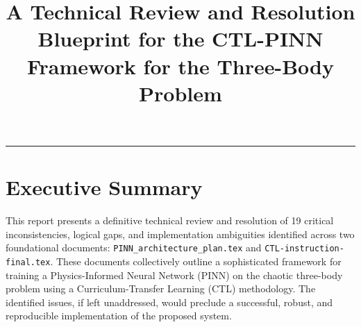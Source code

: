 \documentclass[11pt, a4paper]{article}
\title{\textbf{A Technical Review and Resolution Blueprint for the CTL-PINN Framework for the Three-Body Problem}}
\author{}
\date{}
\begin{document}
\maketitle
\thispagestyle{empty}
\vspace{-2cm}
\hrule
\vspace{0.5cm}
\section*{Executive Summary}
This report presents a definitive technical review and resolution of 19 critical inconsistencies, logical gaps, and implementation ambiguities identified across two foundational documents: \texttt{PINN\_architecture\_plan.tex} and \texttt{CTL-instruction-final.tex}. These documents collectively outline a sophisticated framework for training a Physics-Informed Neural Network (PINN) on the chaotic three-body problem using a Curriculum-Transfer Learning (CTL) methodology. The identified issues, if left unaddressed, would preclude a successful, robust, and reproducible implementation of the proposed system.
\end{document}
